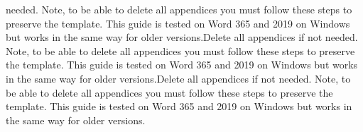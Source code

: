 needed. Note, to be able to delete all appendices you must follow these steps to preserve the template. This guide is tested on Word 365 and 2019 on Windows but works in the same way for older versions.Delete all appendices if not needed. Note, to be able to delete all appendices you must follow these steps to preserve the template. This guide is tested on Word 365 and 2019 on Windows but works in the same way for older versions.Delete all appendices if not needed. Note, to be able to delete all appendices you must follow these steps to preserve the template. This guide is tested on Word 365 and 2019 on Windows but works in the same way for older versions.